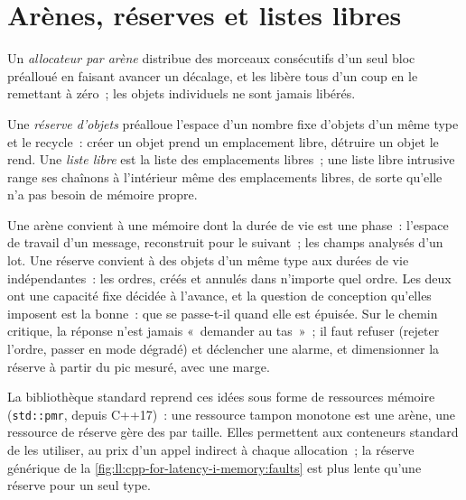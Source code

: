 \section{Arènes, réserves et listes libres}

\begin{definition}\label{def:ll:cpp-for-latency-i-memory:arena}
Un \emph{allocateur par arène} distribue des morceaux consécutifs d'un seul bloc préalloué en faisant avancer
un décalage, et les libère tous d'un coup en le remettant à zéro~; les objets individuels ne sont jamais libérés.
\end{definition}

\begin{definition}\label{def:ll:cpp-for-latency-i-memory:pool}
Une \emph{réserve d'objets} préalloue l'espace d'un nombre fixe d'objets d'un même type et le recycle~:
créer un objet prend un emplacement libre, détruire un objet le rend. Une \emph{liste libre} est la liste des emplacements libres~;
une liste libre intrusive range ses chaînons à l'intérieur même des emplacements libres, de sorte qu'elle n'a pas besoin de mémoire propre.
\end{definition}

Une arène convient à une mémoire dont la durée de vie est une phase~: l'espace de travail d'un message, reconstruit pour le suivant~; les champs analysés
d'un lot. Une réserve convient à des objets d'un même type aux durées de vie indépendantes~: les ordres, créés et annulés dans n'importe
quel ordre. Les deux ont une capacité fixe décidée à l'avance, et la question de conception qu'elles imposent est la bonne~: que se passe-t-il quand
elle est épuisée. Sur le chemin critique, la réponse n'est jamais «~demander au tas~»~; il faut refuser (rejeter l'ordre, passer en
mode dégradé) et déclencher une alarme, et dimensionner la réserve à partir du pic mesuré, avec une marge.

La bibliothèque standard reprend ces idées sous forme de ressources mémoire (\texttt{std::pmr}, depuis C++17)~: une ressource tampon monotone
est une arène, une ressource de réserve gère des  par taille. Elles permettent aux conteneurs standard de les utiliser, au prix d'un appel indirect
à chaque allocation~; la réserve générique de la \cref{fig:ll:cpp-for-latency-i-memory:faults} est plus lente
qu'une réserve pour un seul type.

